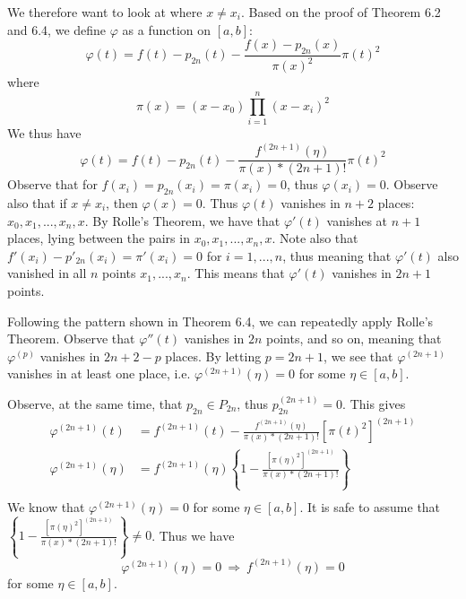 We therefore want to look at where $x \ne x_i$. Based on the proof of Theorem 6.2 and 6.4, we define $\varphi$ as a function on $[a, b]$:
\begin{equation*}
    \varphi(t) = f(t) - p_{2n}(t) - \frac{f(x) - p_{2n}(x)}{\pi(x)^2} \pi(t)^2
\end{equation*}
where
\begin{equation*}
    \pi(x) = (x - x_0) \prod_{i = 1}^n (x - x_i)^2
\end{equation*}
We thus have
\begin{equation*}
    \varphi(t) = f(t) - p_{2n}(t) - \frac{f^{(2n+1)}(\eta)}{\pi(x) * (2n + 1)!} \pi(t)^2
\end{equation*}
Observe that for $f(x_i) = p_{2n}(x_i) = \pi(x_i) = 0$, thus $\varphi(x_i) = 0$. Observe also that if $x \ne x_i$, then $\varphi(x) = 0$. Thus $\varphi(t)$ vanishes in $n + 2$ places: $x_0, x_1, ..., x_n, x$. By Rolle's Theorem, we have that $\varphi'(t)$ vanishes at $n + 1$ places, lying between the pairs in $x_0, x_1, ..., x_n, x$. Note also that $f'(x_i) - p'_{2n}(x_i) = \pi'(x_i) = 0$ for $i = 1, ..., n$, thus meaning that $\varphi'(t)$ also vanished in all $n$ points $x_1, ..., x_n$. This means that $\varphi'(t)$ vanishes in $2n + 1$ points. 

Following the pattern shown in Theorem 6.4, we can repeatedly apply Rolle's Theorem. Observe that $\varphi''(t)$ vanishes in $2n$ points, and so on, meaning that $\varphi^{(p)}$ vanishes in $2n + 2 - p$ places. By letting $p = 2n + 1$, we see that $\varphi^{(2n + 1)}$ vanishes in at least one place, i.e. $\varphi^{(2n+1)}(\eta) = 0$ for some $\eta \in [a, b]$.

Observe, at the same time, that $p_{2n} \in P_{2n}$, thus $p_{2n}^{(2n + 1)} = 0$. This gives
\begin{align*}
    \varphi^{(2n + 1)}(t) &= f^{(2n + 1)}(t) - \frac{f^{(2n+1)}(\eta)}{\pi(x) * (2n + 1)!} \left[\pi(t)^2 \right]^{(2n+1)} \\
    \varphi^{(2n + 1)}(\eta) &= f^{(2n + 1)}(\eta) \left\{ 1 - \frac{\left[\pi(\eta)^2 \right]^{(2n+1)} }{\pi(x) * (2n + 1)!} \right\} \\
\end{align*}
We know that $\varphi^{(2n + 1)}(\eta) = 0$ for some $\eta \in [a, b]$. It is safe to assume that $\left\{ 1 - \frac{\left[\pi(\eta)^2 \right]^{(2n+1)} }{\pi(x) * (2n + 1)!} \right\} \ne 0$. Thus we have
\begin{equation*}
    \varphi^{(2n + 1)}(\eta) = 0 \ \Rightarrow \ f^{(2n + 1)}(\eta) = 0
\end{equation*}
for some $\eta \in [a, b]$.


